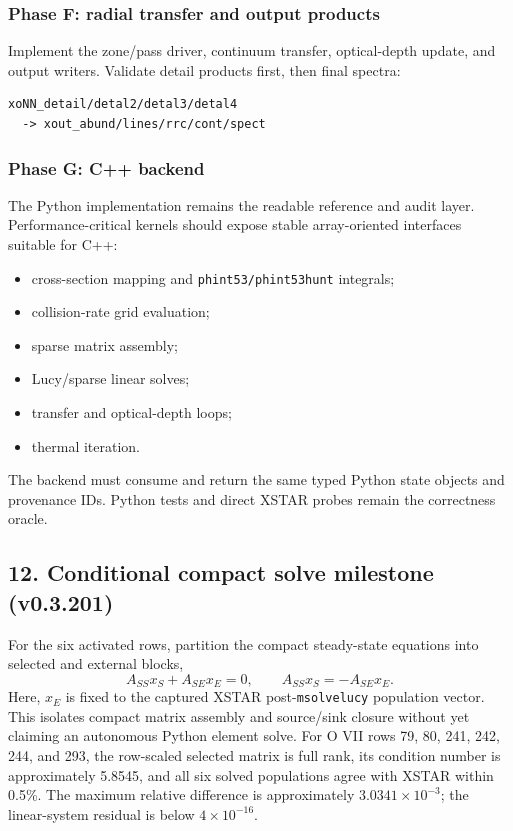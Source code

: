 \documentclass[
  10pt,
]{article}
\newcommand{\passthrough}[1]{#1}
\providecommand{\tightlist}{%
  \setlength{\itemsep}{0pt}\setlength{\parskip}{0pt}}
\begin{document}
\subsubsection{Phase F: radial transfer and output
products}\label{phase-f-radial-transfer-and-output-products}

Implement the zone/pass driver, continuum transfer, optical-depth
update, and output writers. Validate detail products first, then final
spectra:

\begin{lstlisting}
xoNN_detail/detal2/detal3/detal4
  -> xout_abund/lines/rrc/cont/spect
\end{lstlisting}

\subsubsection{Phase G: C++ backend}\label{phase-g-c-backend}

The Python implementation remains the readable reference and audit
layer. Performance-critical kernels should expose stable array-oriented
interfaces suitable for C++:

\begin{itemize}
\tightlist
\item
  cross-section mapping and
  \passthrough{\lstinline!phint53/phint53hunt!} integrals;
\item
  collision-rate grid evaluation;
\item
  sparse matrix assembly;
\item
  Lucy/sparse linear solves;
\item
  transfer and optical-depth loops;
\item
  thermal iteration.
\end{itemize}

The backend must consume and return the same typed Python state objects
and provenance IDs. Python tests and direct XSTAR probes remain the
correctness oracle.

\subsection{12. Conditional compact solve milestone (v0.3.201)}\label{conditional-compact-solve-milestone-v0.3.201}

For the six activated rows, partition the compact steady-state equations into selected and external blocks,
\begin{equation}
A_{SS}x_S + A_{SE}x_E = 0,
\qquad
A_{SS}x_S = -A_{SE}x_E.
\end{equation}
Here, $x_E$ is fixed to the captured XSTAR post-\texttt{msolvelucy} population vector. This isolates compact matrix assembly and source/sink closure without yet claiming an autonomous Python element solve. For O VII rows 79, 80, 241, 242, 244, and 293, the row-scaled selected matrix is full rank, its condition number is approximately 5.8545, and all six solved populations agree with XSTAR within 0.5\%. The maximum relative difference is approximately $3.0341\times10^{-3}$; the linear-system residual is below $4\times10^{-16}$.
\end{document}
